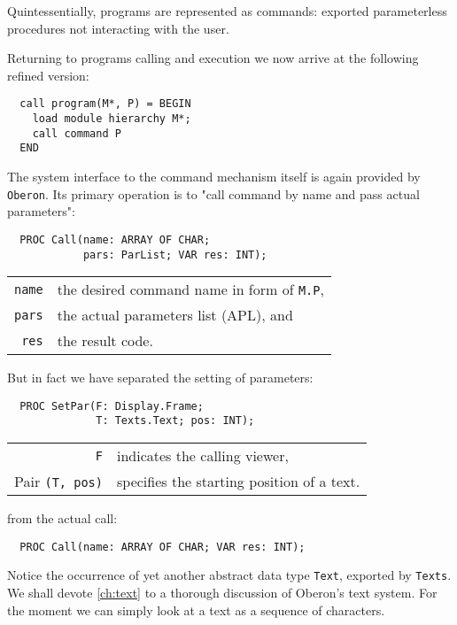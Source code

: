 Quintessentially, programs are represented as commands: exported parameterless procedures
not interacting with the user.

Returning to programs calling and execution we now arrive at the following refined version:
\begin{verbatim}
  call program(M*, P) = BEGIN
    load module hierarchy M*;
    call command P
  END
\end{verbatim}
The system interface to the command mechanism itself is again provided by \verb|Oberon|.
Its primary operation is to "call command by name and pass actual parameters":
\begin{verbatim}
  PROC Call(name: ARRAY OF CHAR;
            pars: ParList; VAR res: INT);
\end{verbatim}
\begin{table}[h!]
  \centering
  \begin{tabular}{r l}
  \verb|name| & the desired command name in form of \verb|M.P|, \\
  \verb|pars| & the actual parameters list (APL), and \\
  \verb|res|  & the result code.
  \end{tabular}
\end{table}

But in fact we have separated the setting of parameters:
\begin{verbatim}
  PROC SetPar(F: Display.Frame;
              T: Texts.Text; pos: INT);
\end{verbatim}
\begin{table}[h!]
  \centering
  \begin{tabular}{r l}
                \verb|F| & indicates the calling viewer, \\
    Pair \verb|(T, pos)| & specifies the starting position of a text.
  \end{tabular}
\end{table}

from the actual call:
\begin{verbatim}
  PROC Call(name: ARRAY OF CHAR; VAR res: INT);
\end{verbatim}

Notice the occurrence of yet another abstract data type \verb|Text|, exported by \verb|Texts|.
We shall devote \ref{ch:text} to a thorough discussion of Oberon's text system.
For the moment we can simply look at a text as a sequence of characters.

